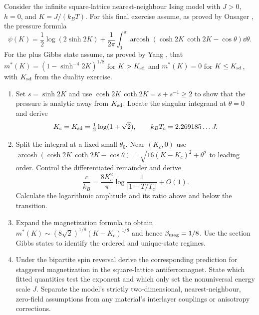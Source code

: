 \begin{exercise}
Consider the infinite square-lattice nearest-neighbour Ising
model with $J>0$, $h=0$, and $K=J/(k_BT)$.
For this final exercise assume, as proved by Onsager
\cite{onsager-ising}, the pressure formula
\[
 \psi(K)=\frac12\log(2\sinh2K)
 +\frac1{2\pi}\int_0^\pi
       \operatorname{arcosh}(\cosh2K\,\coth2K-\cos\theta)\dd\theta.
\]
For the plus Gibbs state assume, as proved by Yang
\cite{yang-magnetization}, that
$m^*(K)=(1-\sinh^{-4}2K)^{1/8}$ for
$K>K_{\rm sd}$ and $m^*(K)=0$ for $K\le K_{\rm sd}$,
with $K_{\rm sd}$ from the duality exercise.
\begin{enumerate}[label=(\alph*)]
\item Set $s=\sinh2K$ and use
$\cosh2K\,\coth2K=s+s^{-1}\ge2$ to show that the
pressure is analytic away from $K_{\rm sd}$.
Locate the singular integrand at $\theta=0$ and derive
\[
 K_c=K_{\rm sd}=\tfrac12\log(1+\sqrt2),\qquad
 k_BT_c=2.269185\ldots J.
\]
\item Split the integral at a fixed small $\theta_0$.
Near $(K_c,0)$ use
$\operatorname{arcosh}(\cosh2K\,\coth2K-\cos\theta)
=\sqrt{16(K-K_c)^2+\theta^2}$ to leading order.
Control the differentiated remainder and derive
\[
 \frac c{k_B}=\frac{8K_c^2}{\pi}
       \log\frac1{|1-T/T_c|}+O(1).
\]
Calculate the logarithmic amplitude and its ratio above
and below the transition.
\item Expand the magnetization formula to obtain
$m^*(K)\sim(8\sqrt2)^{1/8}(K-K_c)^{1/8}$ and hence
$\beta_{\rm mag}=1/8$. Use the section Gibbs states to
identify the ordered and unique-state regimes.
\item Under the bipartite spin reversal derive the
corresponding prediction for staggered magnetization in
the square-lattice antiferromagnet. State which fitted
quantities test the exponent and which only set the
nonuniversal energy scale $J$. Separate the model's
strictly two-dimensional, nearest-neighbour, zero-field
assumptions from any material's interlayer couplings or
anisotropy corrections.
\end{enumerate}
\end{exercise}
